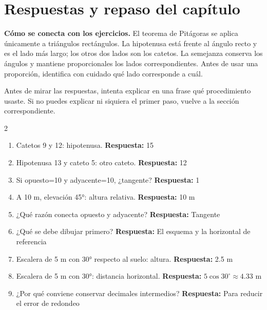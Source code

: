 \documentclass[10pt,oneside,openany]{book}
\begin{document}
\section{Respuestas y repaso del capítulo}

\textbf{Cómo se conecta con los ejercicios.} El teorema de Pitágoras se aplica únicamente a triángulos rectángulos. La hipotenusa está frente al ángulo recto y es el lado más largo; los otros dos lados son los catetos. La semejanza conserva los ángulos y mantiene proporcionales los lados correspondientes. Antes de usar una proporción, identifica con cuidado qué lado corresponde a cuál.

Antes de mirar las respuestas, intenta explicar en una frase qué procedimiento usaste. Si no puedes explicar ni siquiera el primer paso, vuelve a la sección correspondiente.

\begin{multicols}{2}\begin{enumerate}

\item Catetos 9 y 12: hipotenusa. \textbf{Respuesta:} 15

\item Hipotenusa 13 y cateto 5: otro cateto. \textbf{Respuesta:} 12

\item Si opuesto=10 y adyacente=10, ¿tangente? \textbf{Respuesta:} 1

\item A 10 m, elevación 45°: altura relativa. \textbf{Respuesta:} 10 m

\item ¿Qué razón conecta opuesto y adyacente? \textbf{Respuesta:} Tangente

\item ¿Qué se debe dibujar primero? \textbf{Respuesta:} El esquema y la horizontal de referencia

\item Escalera de 5 m con 30° respecto al suelo: altura. \textbf{Respuesta:} 2.5 m

\item Escalera de 5 m con 30°: distancia horizontal. \textbf{Respuesta:} $5\cos30^\circ\approx4.33$ m

\item ¿Por qué conviene conservar decimales intermedios? \textbf{Respuesta:} Para reducir el error de redondeo

\end{enumerate}\end{multicols}
\end{document}
